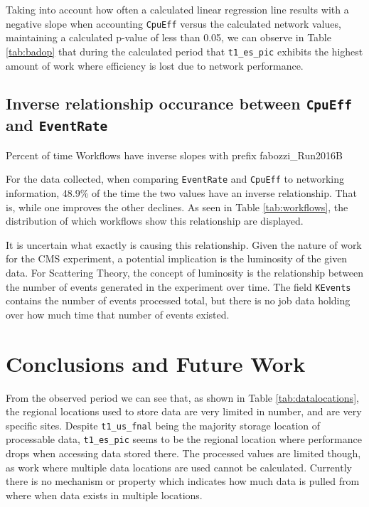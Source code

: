 \documentclass[print,ms]{nuthesis}
\begin{document}
Taking into account how often a calculated linear regression line results with a negative slope when accounting \texttt{CpuEff} versus the calculated network values, maintaining a calculated p-value of less than 0.05, we can observe in Table \ref{tab:badop} that during the calculated period that \texttt{t1\_es\_pic} exhibits the highest amount of work where efficiency is lost due to network performance. 
\section{Inverse relationship occurance between \texttt{CpuEff} and \texttt{EventRate}} \label{sec:inverse}
\begin{table}
	\caption{Percent of time Workflows have inverse slopes with prefix fabozzi\_Run2016B}
	\label{tab:workflows}
\end{table}

For the data collected, when comparing \texttt{EventRate} and \texttt{CpuEff} to networking information, 48.9\% of the time the two values have an inverse relationship. That is, while one improves the other declines. As seen in Table \ref{tab:workflows}, the distribution of which workflows show this relationship are displayed. 

It is uncertain what exactly is causing this relationship. Given the nature of work for the CMS experiment, a potential implication is the luminosity of the given data. For Scattering Theory, the concept of luminosity\cite{lumi} is the relationship between the number of events generated in the experiment over time. The field \texttt{KEvents} contains the number of events processed total, but there is no job data holding over how much time that number of events existed.

\chapter{Conclusions and Future Work}
\label{sec:Conclusion}
From the observed period we can see that, as shown in Table \ref{tab:datalocations}, the regional locations used to store data are very limited in number, and are very specific sites. Despite \texttt{t1\_us\_fnal} being the majority storage location of processable data, \texttt{t1\_es\_pic} seems to be the regional location where performance drops when accessing data stored there. The processed values are limited though, as work where multiple data locations are used cannot be calculated. Currently there is no mechanism or property which indicates how much data is pulled from where when data exists in multiple locations.
\end{document}
